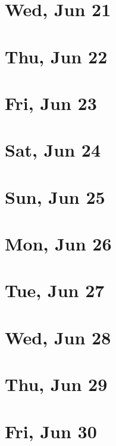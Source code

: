 	\section{Wed, Jun 21}
		
	\section{Thu, Jun 22}
		
	\section{Fri, Jun 23}
		
	\section{Sat, Jun 24}
		
	\section{Sun, Jun 25}
		
	\section{Mon, Jun 26}
		
	\section{Tue, Jun 27}
		
	\section{Wed, Jun 28}
		
	\section{Thu, Jun 29}
		
	\section{Fri, Jun 30}
		

